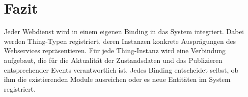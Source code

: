 \section{Fazit}
Jeder Webdienst wird in einem eigenen Binding in das System integriert. Dabei werden Thing-Typen registriert, deren Instanzen konkrete Ausprägungen des Webservices repräsentieren. Für jede Thing-Instanz wird eine Verbindung aufgebaut, die für die Aktualität der Zustandsdaten und das Publizieren entsprechender Events verantwortlich ist. Jedes Binding entscheidet selbst, ob ihm die existierenden Module ausreichen oder es neue Entitäten im System registriert. 






